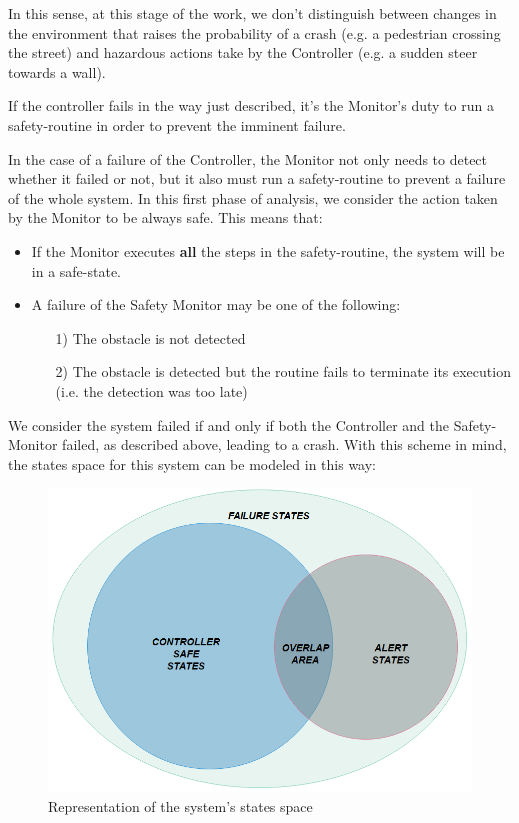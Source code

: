 In this sense, at this stage of the work, we don't distinguish between changes in the environment that raises the probability of a crash (e.g. a pedestrian crossing the street) and hazardous actions take by the Controller (e.g. a sudden steer towards a wall).

If the controller fails in the way just described, it's the Monitor's duty to run a safety-routine in order to prevent the imminent failure.\newline

In the case of a failure of the Controller, the Monitor not only needs to detect whether it failed or not, but it also must run a safety-routine to prevent a failure of the whole system. In this first phase of analysis, we consider the action taken by the Monitor to be always safe. This means that:

\begin{itemize}
	\item If the Monitor executes \textbf{all} the steps in the safety-routine, the system will be in a safe-state.
	\item A failure of the Safety Monitor may be one of the following:
	\begin{itemize}
		\item[1)] The obstacle is not detected
		\item[2)] The obstacle is detected but the routine fails to terminate its execution (i.e. the detection was too late)
	\end{itemize}
\end{itemize}

We consider the system failed if and only if both the Controller and the Safety-Monitor failed, as described above, leading to a crash.
With this scheme in mind, the states space for this system can be modeled in this way:

\begin{figure}[h!]
	\includegraphics[width=\textwidth]{img/state-space-true.png}
	\caption{Representation of the system's states space}
\end{figure}

